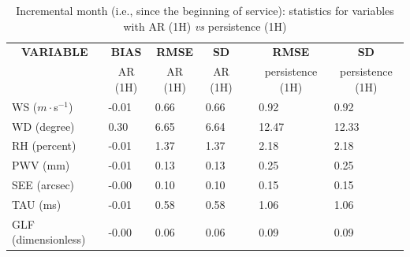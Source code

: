 \begin{table}[]
\begin{center}
\begin{tabular}{|l|l|l|l|l|l|l|}
\hline
\multicolumn{1}{|c|}{\cellcolor[HTML]{C0C0C0}\textbf{VARIABLE}} & \multicolumn{1}{c|}{\cellcolor[HTML]{C0C0C0}\textbf{BIAS}} & \multicolumn{1}{c|}{\cellcolor[HTML]{C0C0C0}\textbf{RMSE}} & \multicolumn{1}{c|}{\cellcolor[HTML]{C0C0C0}\textbf{SD}} & & \multicolumn{1}{c|}{\cellcolor[HTML]{C0C0C0}\textbf{RMSE}} & \multicolumn{1}{c|}{\cellcolor[HTML]{C0C0C0}\textbf{SD}}\\
\multicolumn{1}{|c|}{\cellcolor[HTML]{C0C0C0}} & \multicolumn{1}{c|}{\cellcolor[HTML]{C0C0C0}AR (1H)} & \multicolumn{1}{c|}{\cellcolor[HTML]{C0C0C0}AR (1H)} & \multicolumn{1}{c|}{\cellcolor[HTML]{C0C0C0}AR (1H)} & & \multicolumn{1}{c|}{\cellcolor[HTML]{C0C0C0} persistence (1H)} & \multicolumn{1}{c|}{\cellcolor[HTML]{C0C0C0}persistence (1H)}\\\hline
\cellcolor[HTML]{C0C0C0}WS ($m\cdot$s$^{-1}$) &     -0.01  &      0.66  &      0.66  & &      0.92  &      0.92\\
\cellcolor[HTML]{C0C0C0}WD (degree)           &      0.30  &      6.65  &      6.64  & &     12.47  &     12.33\\
\cellcolor[HTML]{C0C0C0}RH (percent)          &     -0.01  &      1.37  &      1.37  & &      2.18  &      2.18\\
\cellcolor[HTML]{C0C0C0}PWV (mm)              &     -0.01 &      0.13 &      0.13 & &      0.25 &      0.25\\
\cellcolor[HTML]{C0C0C0}SEE (arcsec)          &     -0.00 &      0.10 &      0.10 & &      0.15 &      0.15\\
\cellcolor[HTML]{C0C0C0}TAU (ms)              &     -0.01 &      0.58 &      0.58 & &      1.06 &      1.06\\
\cellcolor[HTML]{C0C0C0}GLF (dimensionless)   &     -0.00 &      0.06 &      0.06 & &      0.09 &      0.09\\
\hline
\end{tabular}
\caption{Incremental month (i.e., since the beginning of service): statistics for variables with AR (1H) \textit{vs} persistence (1H)}
\end{center}
\end{table}

